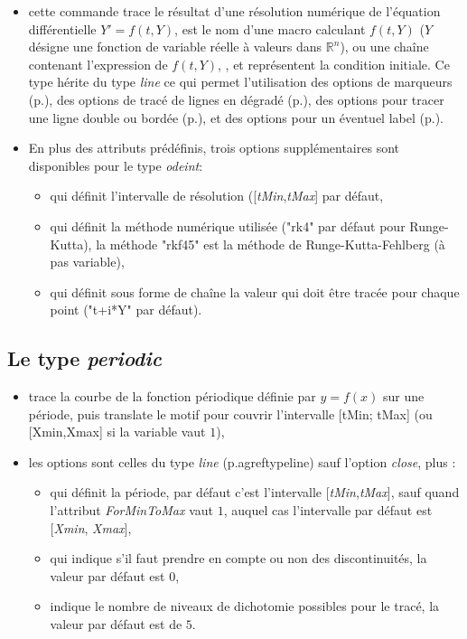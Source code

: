 \begin{itemize}
 \item \desc cette commande trace le résultat d'une résolution numérique de l'équation différentielle $Y'=f(t,Y)$,  est le nom d'une macro calculant $f(t,Y)$ ($Y$ désigne une fonction de variable réelle à valeurs dans $\mathbb R^n$), ou une chaîne contenant l'expression de $f(t,Y)$, , et  représentent la condition initiale. Ce type hérite du type \emph{line} ce qui permet l'utilisation des options de marqueurs (p.\pageref{marqueurs}), des options de tracé de lignes en dégradé (p.\pageref{gradLines}), des options pour tracer une ligne double ou bordée (p.\pageref{optionsline}), et des options pour un éventuel label (p.\pageref{optionslabels}).
 \item En plus des attributs prédéfinis, trois options supplémentaires sont disponibles pour le type \emph{odeint}:\label{odeint}
  \begin{itemize}
  \item {} qui définit l'intervalle de résolution ([\emph{tMin},\emph{tMax}] par défaut,
  \item {} qui définit la méthode numérique utilisée ("rk4" par défaut pour Runge-Kutta), la méthode "rkf45" est la méthode de Runge-Kutta-Fehlberg (à pas variable),
  \item {} qui définit sous forme de chaîne la valeur qui doit être tracée pour chaque point ("t+i*Y" par défaut).
  \end{itemize}
\end{itemize}

\subsection{Le type \emph{periodic}}

{\centering {}\par}

\begin{itemize}
 \item \desc trace la courbe de la fonction périodique définie par $y=f(x)$ sur une période, puis translate le motif pour couvrir l'intervalle [tMin; tMax] (ou [Xmin,Xmax] si la variable  vaut $1$),
 \item les options sont celles du type \emph{line} (p.agref{typeline}) sauf l'option \emph{close}, plus :
  \begin{itemize}
  \item {} qui définit la période, par défaut c'est l'intervalle [\emph{tMin},\emph{tMax}], sauf quand l'attribut \textit{ForMinToMax} vaut $1$, auquel cas l'intervalle par défaut est [\emph{Xmin}, \emph{Xmax}], 
  \item {} qui indique s'il faut prendre en compte ou non des discontinuités, la valeur par défaut est $0$,
  \item {} indique le nombre de niveaux de dichotomie possibles pour le tracé, la valeur par défaut est de $5$.
  \end{itemize}
\end{itemize}

